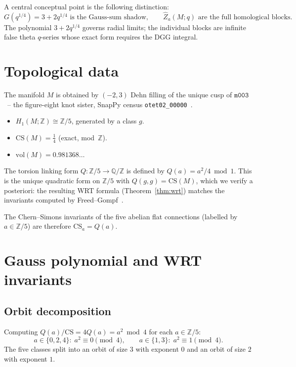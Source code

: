 \documentclass[11pt,a4paper]{article}
\theoremstyle{definition}
\theoremstyle{remark}
\newcommand{\Z}{\mathbb{Z}}
\newcommand{\Q}{\mathbb{Q}}
\newcommand{\CS}{\mathrm{CS}}
\newcommand{\mfld}[1]{\texttt{#1}}
\newcommand{\vol}{\mathrm{vol}}
\begin{document}
A central conceptual point is the following distinction:
\[
G(q^{1/4})=3+2q^{1/4} \text{ is the Gauss-sum shadow},
\qquad
\hat Z_a(M;q) \text{ are the full homological blocks.}
\]
The polynomial $3+2q^{1/4}$ governs radial limits; the individual
blocks are infinite false theta $q$-series whose exact form
requires the DGG integral.

\section{Topological data}
\label{sec:data}

The manifold $M$ is obtained by $(-2,3)$ Dehn filling of the unique
cusp of $\mfld{m003}$~-- the figure-eight knot sister,
SnapPy census \texttt{otet02\_00000}~\cite{SnapPy}.

\begin{itemize}
\item $H_1(M;\Z)\cong\Z/5$, generated by a class $g$.
\item $\CS(M)=\tfrac{1}{4}$ (exact, mod~$\Z$).
\item $\vol(M)=0.981368\ldots$
\end{itemize}

The torsion linking form $Q\colon\Z/5\to\Q/\Z$ is defined by
$Q(a)=a^2/4\bmod1$.
This is the unique quadratic form on $\Z/5$ with $Q(g,g)=\CS(M)$,
which we verify a posteriori: the resulting WRT formula
(Theorem~\ref{thm:wrt}) matches the invariants computed
by Freed--Gompf~\cite{FreedGompf}.

The Chern--Simons invariants of the five abelian flat connections
(labelled by $a\in\Z/5$) are therefore $\CS_a=Q(a)$.

\section{Gauss polynomial and WRT invariants}
\label{sec:gauss}

\subsection{Orbit decomposition}

Computing $Q(a)/\CS = 4Q(a) = a^2\bmod4$ for each $a\in\Z/5$:
\[
a\in\{0,2,4\}:\; a^2\equiv0\pmod4,\qquad
a\in\{1,3\}:\; a^2\equiv1\pmod4.
\]
The five classes split into an orbit of size $3$ with exponent $0$
and an orbit of size $2$ with exponent $1$.
\end{document}
